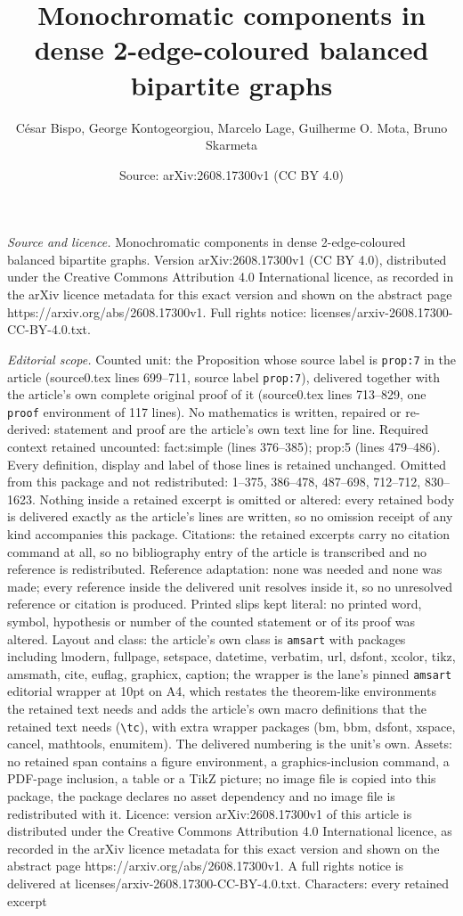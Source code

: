 \documentclass[10pt,a4paper]{amsart}
\title[Monochromatic components in dense 2-edge-coloured balanced b]{Monochromatic components in dense 2-edge-coloured balanced bipartite graphs}
\author{C\'esar Bispo, George Kontogeorgiou, Marcelo Lage, Guilherme O. Mota, Bruno Skarmeta}
\date{Source: arXiv:2608.17300v1 (CC BY 4.0)}
\begin{document}
\maketitle

\noindent\emph{Source and licence.} Monochromatic components in dense 2-edge-coloured balanced bipartite graphs. Version arXiv:2608.17300v1 (CC BY 4.0), distributed under the Creative Commons Attribution 4.0 International licence, as recorded in the arXiv licence metadata for this exact version and shown on the abstract page https://arxiv.org/abs/2608.17300v1. Full rights notice: licenses/arxiv-2608.17300-CC-BY-4.0.txt.\par\smallskip

\noindent\textit{Editorial scope.} Counted unit: the Proposition whose source label is \texttt{prop:7} in the article (source0.tex lines 699--711, source label \texttt{prop:7}), delivered together with the article's own complete original proof of it (source0.tex lines 713--829, one \texttt{proof} environment of 117 lines). No mathematics is written, repaired or re-derived: statement and proof are the article's own text line for line. Required context retained uncounted: fact:simple (lines 376--385); prop:5 (lines 479--486). Every definition, display and label of those lines is retained unchanged. Omitted from this package and not redistributed: 1--375, 386--478, 487--698, 712--712, 830--1623. Nothing inside a retained excerpt is omitted or altered: every retained body is delivered exactly as the article's lines are written, so no omission receipt of any kind accompanies this package. Citations: the retained excerpts carry no citation command at all, so no bibliography entry of the article is transcribed and no reference is redistributed. Reference adaptation: none was needed and none was made; every reference inside the delivered unit resolves inside it, so no unresolved reference or citation is produced. Printed slips kept literal: no printed word, symbol, hypothesis or number of the counted statement or of its proof was altered. Layout and class: the article's own class is \texttt{amsart} with packages including lmodern, fullpage, setspace, datetime, verbatim, url, dsfont, xcolor, tikz, amsmath, cite, euflag, graphicx, caption; the wrapper is the lane's pinned \texttt{amsart} editorial wrapper at 10pt on A4, which restates the theorem-like environments the retained text needs and adds the article's own macro definitions that the retained text needs (\texttt{\textbackslash tc}), with extra wrapper packages (bm, bbm, dsfont, xspace, cancel, mathtools, enumitem). The delivered numbering is the unit's own. Assets: no retained span contains a figure environment, a graphics-inclusion command, a PDF-page inclusion, a table or a TikZ picture; no image file is copied into this package, the package declares no asset dependency and no image file is redistributed with it. Licence: version arXiv:2608.17300v1 of this article is distributed under the Creative Commons Attribution 4.0 International licence, as recorded in the arXiv licence metadata for this exact version and shown on the abstract page https://arxiv.org/abs/2608.17300v1. A full rights notice is delivered at licenses/arxiv-2608.17300-CC-BY-4.0.txt. Characters: every retained excerpt 
\end{document}
